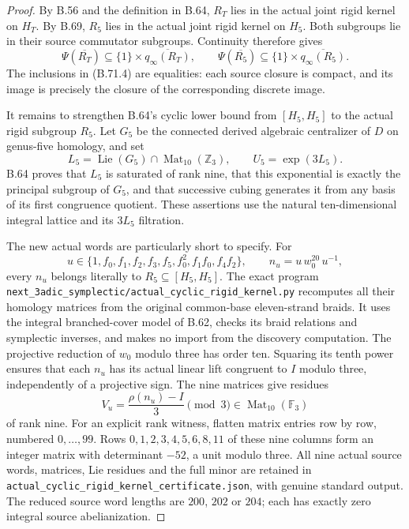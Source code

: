 \begin{proof}
By B.56 and the definition in B.64, $R_T$ lies in the
actual joint rigid kernel on $H_T$.
By B.69, $R_5$ lies in the actual joint rigid kernel
on $H_5$.  Both subgroups lie in their source commutator
subgroups.  Continuity therefore gives
\[
 \Psi(\overline{R_T})\subseteq\{1\}\times
                     \overline{q_\infty(R_T)},\qquad
 \Psi(\overline{R_5})\subseteq\{1\}\times
                     \overline{q_\infty(R_5)}.                \tag{B.71.4}
\]
The inclusions in (B.71.4) are equalities: each source
closure is compact, and its image is precisely the
closure of the corresponding discrete image.

It remains to strengthen B.64's cyclic lower bound
from $[H_5,H_5]$ to the actual rigid subgroup $R_5$.
Let $G_5$ be the connected derived algebraic centralizer
of $D$ on genus-five homology, and set
\[
 L_5=\operatorname{Lie}(G_5)\cap
                         \operatorname{Mat}_{10}(\mathbb Z_3),
 \qquad U_5=\exp(3L_5).
                                                               \tag{B.71.5}
\]
B.64 proves that $L_5$ is saturated of rank nine,
that this exponential is exactly the principal
subgroup of $G_5$, and that successive cubing generates
it from any basis of its first congruence quotient.
These assertions use the natural ten-dimensional
integral lattice and its $3L_5$ filtration.

The new actual words are particularly short to specify.
For
\[
 u\in\{1,f_0,f_1,f_2,f_3,f_5,f_0^2,f_1f_0,f_4f_2\},
 \qquad n_u=u\,w_0^{20}\,u^{-1},                            \tag{B.71.6}
\]
every $n_u$ belongs literally to $R_5\subseteq[H_5,H_5]$.
The exact program
\nolinkurl{next_3adic_symplectic/actual_cyclic_rigid_kernel.py}
recomputes all their homology matrices from the original
common-base eleven-strand braids.
It uses the integral branched-cover model of B.62,
checks its braid relations and symplectic inverses,
and makes no import from the discovery computation.
The projective reduction of $w_0$ modulo three has
order ten.  Squaring its tenth power ensures that
each $n_u$ has its actual linear lift congruent to $I$
modulo three, independently of a projective sign.
The nine matrices give residues
\[
                V_u=\frac{\rho(n_u)-I}{3}\pmod3
                       \in\operatorname{Mat}_{10}(\mathbb F_3)
                                                               \tag{B.71.7}
\]
of rank nine.
For an explicit rank witness, flatten matrix entries
row by row, numbered $0,\ldots,99$.
Rows $0,1,2,3,4,5,6,8,11$ of these nine columns form
an integer matrix with determinant $-52$, a unit
modulo three.
All nine actual source words, matrices, Lie residues
and the full minor are retained in
\nolinkurl{actual_cyclic_rigid_kernel_certificate.json},
with genuine standard output.
The reduced source word lengths are $200$, $202$ or $204$;
each has exactly zero integral source abelianization.


\end{proof}
